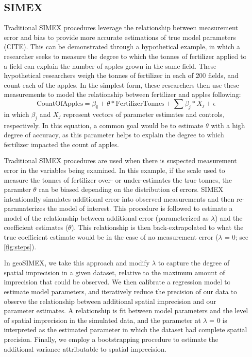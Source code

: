 \subsection{SIMEX}
Traditional SIMEX procedures leverage the relationship between measurement error and bias to provide more accurate estimations of true model parameters (CITE).  
This can be demonstrated through a hypothetical example, in which a researcher seeks to measure the degree to which the tonnes of fertilizer applied to a field can explain the number of apples grown in the same field.
These hypothetical researchers weigh the tonnes of fertilizer in each of 200 fields, and count each of the apples.
In the simplest form, these researchers then use these measurements to model the relationship between fertilizer and apples following:
\begin{equation}\label{eq:fertilizer}
\text{CountOfApples} = \beta_{0} + \theta * \text{FertilizerTonnes} + \sum{\beta_{j} * X_{j}} + \epsilon
\end{equation}
\noindent in which $\beta_{j}$ and $X_{j}$ represent vectors of parameter estimates and controls, respectively. 
In this equation, a common goal would be to estimate $\theta$ with a high degree of accuracy, as this parameter helps to explain the degree to which fertilizer impacted the count of apples.
\par
Traditional SIMEX procedures are used when there is suspected measurement error in the variables being examined.
In this example, if the scale used to measure the tonnes of fertilizer over- or under-estimates the true tonnes, the paramter $\theta$ can be biased depending on the distribution of errors.
SIMEX intentionally simulates additional error into observed measurements and then re-paramaterizes the model of interest.
This procedure is followed to estimate a model of the relationship between additional error (parameterized as $\lambda$) and the coefficient estimates ($\theta$).
This relationship is then back-extrapolated to what the true coefficient estimate would be in the case of no measurement error ($\lambda$ = 0; see \ref{fig:steps}).
\par
In geoSIMEX, we take this approach and modify $\lambda$ to capture the degree of spatial imprecision in a given dataset, relative to the maximum amount of imprecision that could be observed.
We then calibrate a regression model to estimate model parameters, and iteratively reduce the precision of our data to observe the relationship between additional spatial imprecision and our parameter estimates.
A relationship is fit between model parameters and the level of spatial imprecision in the simulated data, and the parameter at $\lambda$ = 0 is interpreted as the estimated parameter in which the dataset had complete spatial precision.
Finally, we employ a bootstrapping procedure to estimate the additional variance attributable to spatial imprecision.





